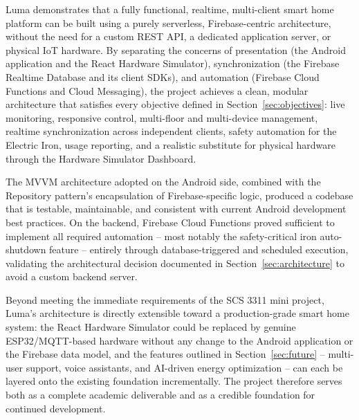 \documentclass[11pt,a4paper]{article}
\begin{document}
Luma demonstrates that a fully functional, realtime, multi-client smart home platform can be built using a purely serverless, Firebase-centric architecture, without the need for a custom REST API, a dedicated application server, or physical IoT hardware. By separating the concerns of presentation (the Android application and the React Hardware Simulator), synchronization (the Firebase Realtime Database and its client SDKs), and automation (Firebase Cloud Functions and Cloud Messaging), the project achieves a clean, modular architecture that satisfies every objective defined in Section~\ref{sec:objectives}: live monitoring, responsive control, multi-floor and multi-device management, realtime synchronization across independent clients, safety automation for the Electric Iron, usage reporting, and a realistic substitute for physical hardware through the Hardware Simulator Dashboard.

The MVVM architecture adopted on the Android side, combined with the Repository pattern's encapsulation of Firebase-specific logic, produced a codebase that is testable, maintainable, and consistent with current Android development best practices. On the backend, Firebase Cloud Functions proved sufficient to implement all required automation -- most notably the safety-critical iron auto-shutdown feature -- entirely through database-triggered and scheduled execution, validating the architectural decision documented in Section~\ref{sec:architecture} to avoid a custom backend server.

Beyond meeting the immediate requirements of the SCS 3311 mini project, Luma's architecture is directly extensible toward a production-grade smart home system: the React Hardware Simulator could be replaced by genuine ESP32/MQTT-based hardware without any change to the Android application or the Firebase data model, and the features outlined in Section~\ref{sec:future} -- multi-user support, voice assistants, and AI-driven energy optimization -- can each be layered onto the existing foundation incrementally. The project therefore serves both as a complete academic deliverable and as a credible foundation for continued development.
\end{document}
